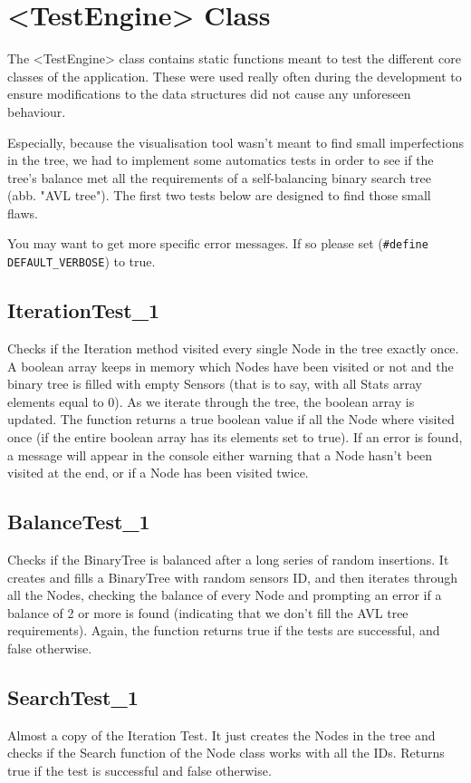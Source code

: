 \documentclass[10pt]{article}
\begin{document}
\section{<TestEngine> Class}
The <TestEngine> class contains static functions meant to test the different core classes of the application. These were used really often during the development to ensure modifications to the data structures did not cause any unforeseen behaviour.

Especially, because the visualisation tool wasn't meant to find small imperfections in the tree, we had to implement some automatics tests in order to see if the tree's balance met all the requirements of a self-balancing binary search tree (abb. "AVL tree"). The first two tests below are designed to find those small flaws.

You may want to get more specific error messages. If so please set (\texttt{\#define DEFAULT\_VERBOSE}) to true.

\subsection{IterationTest\_1}
Checks if the Iteration method visited every single Node in the tree exactly once. A boolean array keeps in memory which Nodes have been visited or not and the binary tree is filled with empty Sensors (that is to say, with all Stats array elements equal to 0). As we iterate through the tree, the boolean array is updated. The function returns a true boolean value if all the Node where visited once (if the entire boolean array has its elements set to true). If an error is found, a message will appear in the console either warning that a Node hasn't been visited at the end, or if a Node has been visited twice.

\subsection{BalanceTest\_1}
Checks if the BinaryTree is balanced after a long series of random insertions. It creates and fills a BinaryTree with random sensors ID, and then iterates through all the Nodes, checking the balance of every Node and prompting an error if a balance of 2 or more is found (indicating that we don't fill the AVL tree requirements). Again, the function returns true if the tests are successful, and false otherwise.

\subsection{SearchTest\_1}
Almost a copy of the Iteration Test. It just creates the Nodes in the tree and checks if the Search function of the Node class works with all the IDs. Returns true if the test is successful and false otherwise.
\end{document}
